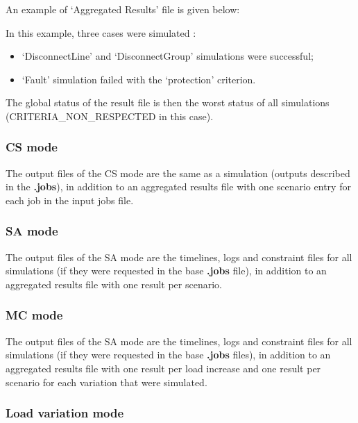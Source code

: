 \documentclass[a4paper, 12pt]{report}
\begin{document}
An example of  `Aggregated Results' file is given below:



In this example, three cases were simulated :
\begin{itemize}
  \item `DisconnectLine' and `DisconnectGroup' simulations were successful;
  \item `Fault' simulation failed with the `protection' criterion.
\end{itemize}
The global status of the result file is then the worst status of all simulations (CRITERIA\_NON\_RESPECTED in this case).

\subsubsection{CS mode}

The output files of the CS mode are the same as a \Dynawo simulation (outputs described in the \textbf{.jobs}), in addition to an aggregated 
results file with one scenario entry for each job in the input jobs file.


\subsubsection{SA mode}

The output files of the SA mode are the timelines, logs and constraint files for all simulations (if they were requested in the base \textbf{.jobs} file), in addition to an aggregated 
results file with one result per scenario.

\subsubsection{MC mode}

The output files of the SA mode are the timelines, logs and constraint files for all simulations (if they were requested in the base \textbf{.jobs} files), in addition to an aggregated 
results file with one result per load increase and one result per scenario for each variation that were simulated.




\subsubsection{Load variation mode}
\end{document}
